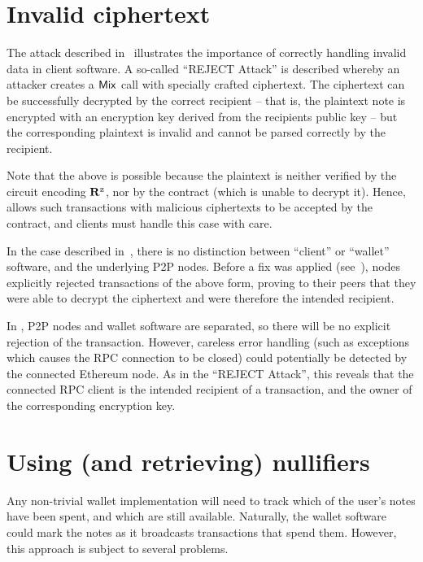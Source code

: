 \section{Invalid ciphertext}\label{appendix:sca-attacks:invalid-ciphertext}

The attack described in~\cite[Section 4.2.1]{tramerremote} illustrates the importance of correctly handling invalid data in client software. A so-called ``REJECT Attack'' is described whereby an attacker creates a $\mathsf{Mix}$ call with specially crafted ciphertext. The ciphertext can be successfully decrypted by the correct recipient -- that is, the plaintext note is encrypted with an encryption key derived from the recipients public key -- but the corresponding plaintext is invalid and cannot be parsed correctly by the recipient.

\begin{notebox}
    Note that the above is possible because the plaintext is neither verified by the circuit encoding $\mathbf{R}^{\texttt{z}}$, nor by the contract (which is unable to decrypt it). Hence, \zeth{} allows such transactions with malicious ciphertexts to be accepted by the \mixer{} contract, and clients must handle this case with care.
\end{notebox}

In the case described in~\cite{tramerremote}, there is no distinction between ``client'' or ``wallet'' software, and the underlying P2P nodes. Before a fix was applied (see~\cite{zcash-remote-sca-fix-announcement}), nodes explicitly rejected transactions of the above form, proving to their peers that they were able to decrypt the ciphertext and were therefore the intended recipient.

In \zeth{}, P2P nodes and wallet software are separated, so there will be no explicit rejection of the transaction. However, careless error handling (such as exceptions which causes the RPC connection to be closed) could potentially be detected by the connected Ethereum node. As in the ``REJECT Attack'', this reveals that the connected RPC client is the intended recipient of a transaction, and the owner of the corresponding encryption key.

\section{Using (and retrieving) nullifiers}\label{appendix:sca-attacks:nullifiers}

Any non-trivial wallet implementation will need to track which of the user's \zeth{} notes have been spent, and which are still available. Naturally, the wallet software could mark the notes as it broadcasts transactions that spend them. However, this approach is subject to several problems.

